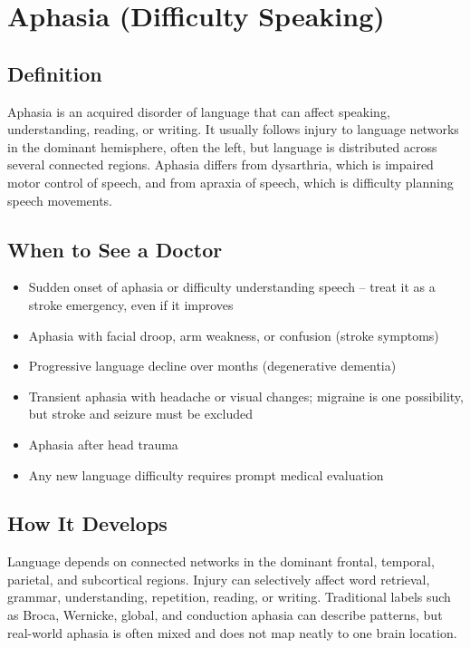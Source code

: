 \chapter{Aphasia (Difficulty Speaking)}

\section*{Definition}
Aphasia is an acquired disorder of language that can affect speaking, understanding, reading, or writing. It usually follows injury to language networks in the dominant hemisphere, often the left, but language is distributed across several connected regions. Aphasia differs from dysarthria, which is impaired motor control of speech, and from apraxia of speech, which is difficulty planning speech movements.

\section*{When to See a Doctor}

\begin{itemize}
 \item Sudden onset of aphasia or difficulty understanding speech -- treat it as a stroke emergency, even if it improves
 \item Aphasia with facial droop, arm weakness, or confusion (stroke symptoms)
 \item Progressive language decline over months (degenerative dementia)
 \item Transient aphasia with headache or visual changes; migraine is one possibility, but stroke and seizure must be excluded
 \item Aphasia after head trauma
 \item Any new language difficulty requires prompt medical evaluation
\end{itemize}

\section*{How It Develops}
Language depends on connected networks in the dominant frontal, temporal, parietal, and subcortical regions. Injury can selectively affect word retrieval, grammar, understanding, repetition, reading, or writing. Traditional labels such as Broca, Wernicke, global, and conduction aphasia can describe patterns, but real-world aphasia is often mixed and does not map neatly to one brain location.

